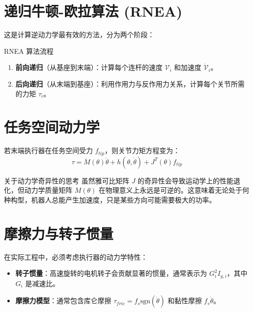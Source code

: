 \section{递归牛顿-欧拉算法 (RNEA)}
这是计算逆动力学最有效的方法，分为两个阶段：

\begin{mybox}{RNEA 算法流程}
\begin{enumerate}
    \item \textbf{前向递归}（从基座到末端）：计算每个连杆的速度 $\mathcal{V}_i$ 和加速度 $\dot{\mathcal{V}}_i$。
    \item \textbf{后向递归}（从末端到基座）：利用作用力与反作用力关系，计算每个关节所需的力矩 $\tau_i$。
\end{enumerate}
\end{mybox}



\section{任务空间动力学}
若末端执行器在任务空间受力 $f_{tip}$，则关节力矩方程变为：
\begin{equation}
    \tau = M(\theta)\ddot{\theta} + h(\theta, \dot{\theta}) + J^T(\theta) f_{tip}
\end{equation}

\begin{thoughtbox}{关于动力学奇异性的思考}
虽然雅可比矩阵 $J$ 的奇异性会导致运动学上的性能退化，但动力学质量矩阵 $M(\theta)$ 在物理意义上永远是可逆的。这意味着无论处于何种构型，机器人总能产生加速度，只是某些方向可能需要极大的功率。
\end{thoughtbox}

\section{摩擦力与转子惯量}
在实际工程中，必须考虑执行器的动力学特性：
\begin{itemize}
    \item \textbf{转子惯量}：高速旋转的电机转子会贡献显著的惯量，通常表示为 $G_i^2 I_{g,i}$，其中 $G_i$ 是减速比。
    \item \textbf{摩擦力模型}：通常包含库仑摩擦 $\tau_{fric} = f_s \text{sgn}(\dot{\theta})$ 和黏性摩擦 $f_v \dot{\theta}$。
\end{itemize}



\clearpage
